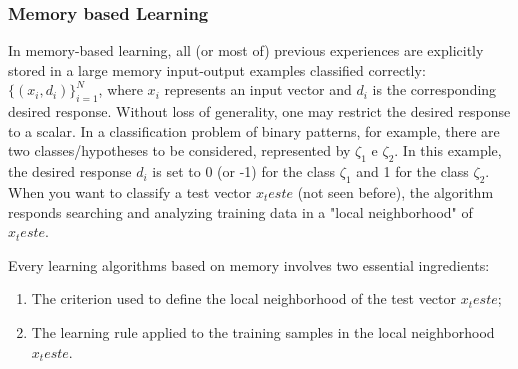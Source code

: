 \subsubsection{Memory based Learning}

In memory-based learning, all (or most of) previous experiences are explicitly stored in a large memory input-output examples classified correctly: $ \{ ( x_i, d_i ) \}^{N}_{i=1}$, where $x_i$ represents an input vector and $d_i$ is the corresponding desired response. Without loss of generality, one may restrict the desired response to a scalar. In a classification problem of binary patterns, for example, there are two classes/hypotheses to be considered, represented by $\zeta_1$ e $\zeta_2$. In this example, the desired response $d_i$ is set to 0 (or -1) for the class $\zeta_1$ and 1 for the class $\zeta_2$. When you want to classify a test vector $x_teste$ (not seen before), the algorithm responds searching and analyzing training data in a "local neighborhood" of $x_teste$.

Every learning algorithms based on memory involves two essential ingredients:

\begin{enumerate}
\item The criterion used to define the local neighborhood of the test vector $x_teste$;
\item The learning rule applied to the training samples in the local neighborhood $x_teste$.
\end{enumerate}

